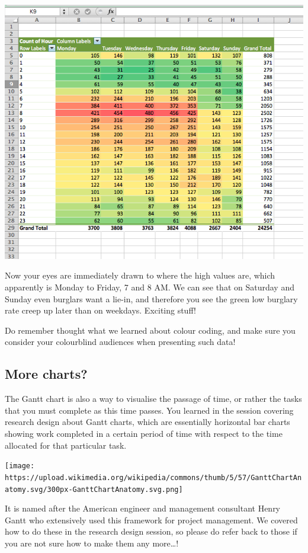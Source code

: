 \documentclass[
]{book}
\begin{document}
\includegraphics{imgs/cond_3.png}

Now your eyes are immediately drawn to where the high values are, which apparently is Monday to Friday, 7 and 8 AM. We can see that on Saturday and Sunday even burglars want a lie-in, and therefore you see the green low burglary rate creep up later than on weekdays. Exciting stuff!

Do remember thought what we learned about colour coding, and make sure you consider your colourblind audiences when presenting such data!

\hypertarget{more-charts}{%
\subsection{More charts?}\label{more-charts}}

The Gantt chart is also a way to visualise the passage of time, or rather the tasks that you must complete as this time passes. You learned in the session covering research design about Gantt charts, which are essentially horizontal bar charts showing work completed in a certain period of time with respect to the time allocated for that particular task.

\texttt{[image: https://upload.wikimedia.org/wikipedia/commons/thumb/5/57/GanttChartAnatomy.svg/300px-GanttChartAnatomy.svg.png]}

It is named after the American engineer and management consultant Henry Gantt who extensively used this framework for project management. We covered how to do these in the research design session, so please do refer back to those if you are not sure how to make them any more\ldots!
\end{document}
